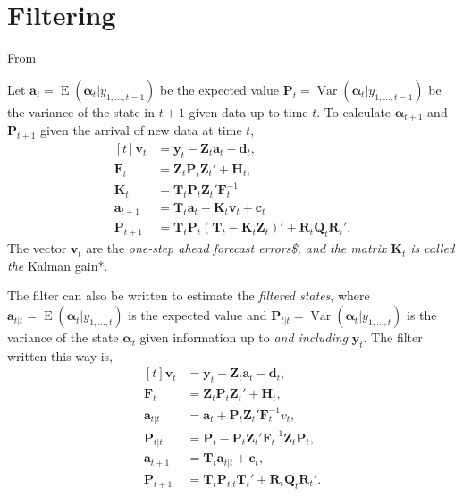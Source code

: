 \documentclass[]{book}
\DeclareMathOperator{\E}{E}
\DeclareMathOperator{\Var}{Var}
\newcommand{\mat}[1]{\boldsymbol{#1}}
\renewcommand{\vec}[1]{\boldsymbol{#1}}
\renewcommand{\T}{'}
\begin{document}
\section{Filtering}\label{filtering}

From \autocite[Sec 4.3]{DurbinKoopman2012}

Let \(\vec{a}_t = \E(\vec{\alpha}_t | y_{1, \dots, t - 1})\) be the
expected value
\(\vec{P}_t = \Var(\vec{\alpha}_t | y_{1, \dots, t - 1})\) be the
variance of the state in \(t + 1\) given data up to time \(t\). To
calculate \(\vec{\alpha}_{t + 1}\) and \(\mat{P}_{t + 1}\) given the
arrival of new data at time \(t\), \[
\begin{aligned}[t]
\vec{v}_t &= \vec{y}_t - \mat{Z}_t \vec{a}_t - \vec{d}_t, \\
\mat{F}_t &= \mat{Z}_t \mat{P}_t \mat{Z}_t\T + \mat{H}_t, \\
\mat{K}_t &= \mat{T}_t \mat{P}_t \mat{Z}_t\T \mat{F}_t^{-1} \\
\vec{a}_{t + 1} &= \mat{T}_t \vec{a}_t + \mat{K}_t \vec{v}_t + \vec{c}_t \\
\mat{P}_{t + 1} &= \mat{T}_t \mat{P}_t (\mat{T}_t - \mat{K}_t \mat{Z}_t)\T + \mat{R}_t \mat{Q}_t \mat{R}_t\T .
\end{aligned}
\] The vector \(\vec{v}_t\) are the \emph{one-step ahead forecast
errors\$, and the matrix \(\mat{K}_t\) is called the }Kalman gain*.

The filter can also be written to estimate the \emph{filtered states},
where \(\vec{a}_{t|t} = \E(\vec{\alpha}_t | y_{1, \dots, t})\) is the
expected value and
\(\vec{P}_{t|t} = \Var(\vec{\alpha}_t | y_{1, \dots, t})\) is the
variance of the state \(\vec{\alpha}_t\) given information up to
\emph{and including} \(\vec{y}_t\). The filter written this way is, \[
\begin{aligned}[t]
\vec{v}_t &= \vec{y}_t - \mat{Z}_t \vec{a}_t - \vec{d}_t, \\
\mat{F}_t &= \mat{Z}_t \mat{P}_t \mat{Z}_t\T + \mat{H}_t, \\
\vec{a}_{t|t} &= \vec{a}_t + \mat{P}_t \mat{Z}_t\T \mat{F}_t^{-1} v_t , \\
\mat{P}_{t|t} &= \mat{P}_t - \mat{P}_t \mat{Z}_t\T \mat{F}_t^{-1} \mat{Z}_t \mat{P}_t , \\
\vec{a}_{t + 1} &= \mat{T}_{t} \vec{a}_{t|t} + \vec{c}_t, \\
\mat{P}_{t + 1} & = \mat{T}_t \mat{P}_{t|t} \mat{T}_t\T + \mat{R}_t \mat{Q}_t \mat{R}_t\T .
\end{aligned}
\]
\end{document}
